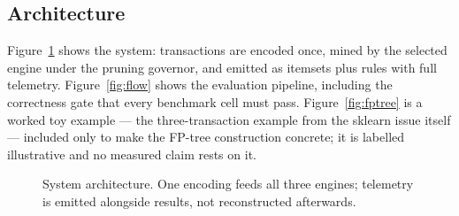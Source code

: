 \documentclass[twocolumn,10pt]{article}
\begin{document}
\subsection{Architecture}
Figure~\ref{fig:arch} shows the system: transactions are encoded once,
mined by the selected engine under the pruning governor, and emitted as
itemsets plus rules with full telemetry. Figure~\ref{fig:flow} shows
the evaluation pipeline, including the correctness gate that every
benchmark cell must pass. Figure~\ref{fig:fptree} is a worked toy
example --- the three-transaction example from the sklearn issue itself
--- included only to make the FP-tree construction concrete; it is
labelled illustrative and no measured claim rests on it.

\begin{figure}[t]
\centering
{}
\caption{System architecture. One encoding feeds all three engines;
telemetry is emitted alongside results, not reconstructed afterwards.}
\label{fig:arch}
\end{figure}
\end{document}
